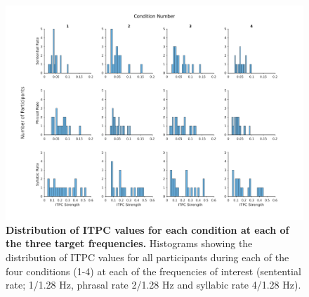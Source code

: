\documentclass[10pt,letterpaper]{article}
\begin{document}

\begin{figure}[tbhp]
\includegraphics[width=\linewidth]{ITPC_Distributions.png}
\caption{\textbf{Distribution of ITPC values for each condition at each of the three target frequencies.} Histograms showing the distribution of ITPC values for all participants during each of the four conditions (1-4) at each of the frequencies of interest (sentential rate; 1/1.28 Hz, phrasal rate 2/1.28 Hz and syllabic rate 4/1.28 Hz).}
\label{ITPC_Distribution}
\end{figure}
\end{document}
